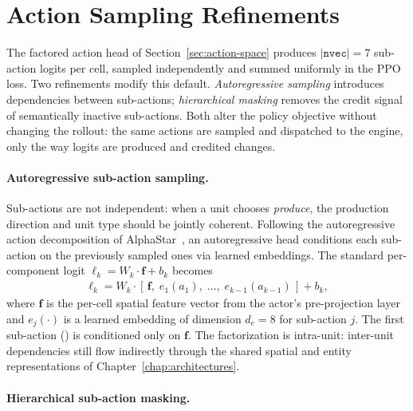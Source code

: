 \section{Action Sampling Refinements}
\label{sec:training-enhancements}
\label{sec:action-sampling}

The factored action head of Section~\ref{sec:action-space} produces $\lvert \mathtt{nvec} \rvert = 7$ sub-action logits per cell, sampled independently and summed uniformly in the PPO loss. Two refinements modify this default. \emph{Autoregressive sampling} introduces dependencies between sub-actions; \emph{hierarchical masking} removes the credit signal of semantically inactive sub-actions. Both alter the policy objective without changing the rollout: the same actions are sampled and dispatched to the engine, only the way logits are produced and credited changes.

\paragraph{Autoregressive sub-action sampling.}

Sub-actions are not independent: when a unit chooses \emph{produce}, the production direction and unit type should be jointly coherent. Following the autoregressive action decomposition of AlphaStar~\cite{vinyalsGrandmasterLevelStarCraft2019}, an autoregressive head conditions each sub-action on the previously sampled ones via learned embeddings. The standard per-component logit $\ell_k = W_k \cdot \mathbf{f} + b_k$ becomes
\begin{align}
\ell_k = W_k \cdot [\,\mathbf{f},\; e_1(a_1),\; \ldots,\; e_{k-1}(a_{k-1})\,] + b_k,
\end{align}
where $\mathbf{f}$ is the per-cell spatial feature vector from the actor's pre-projection layer and $e_j(\cdot)$ is a learned embedding of dimension $d_e = 8$ for sub-action $j$. The first sub-action () is conditioned only on $\mathbf{f}$. The factorization is intra-unit: inter-unit dependencies still flow indirectly through the shared spatial and entity representations of Chapter~\ref{chap:architectures}.

\paragraph{Hierarchical sub-action masking.}


